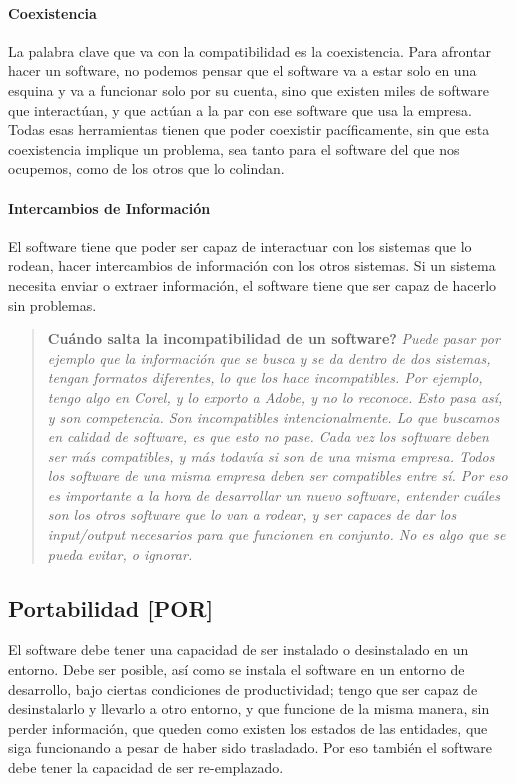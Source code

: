 \hypertarget{coexistencia}{%
\paragraph{Coexistencia}\label{coexistencia}}
La palabra clave que va con la compatibilidad
  es la coexistencia. Para afrontar hacer un software, no podemos pensar
  que el software va a estar solo en una esquina y va a funcionar solo
  por su cuenta, sino que existen miles de software que interactúan, y
  que actúan a la par con ese software que usa la empresa. Todas esas
  herramientas tienen que poder coexistir pacíficamente, sin que esta
  coexistencia implique un problema, sea tanto para el software del que
  nos ocupemos, como de los otros que lo colindan.
\hypertarget{intercambios}{%
\paragraph{Intercambios de Información}\label{intercambios}}
El software tiene que poder ser
  capaz de interactuar con los sistemas que lo rodean, hacer
  intercambios de información con los otros sistemas. Si un sistema
  necesita enviar o extraer información, el software tiene que ser capaz
  de hacerlo sin problemas.


\begin{quote}
\textbf{Cuándo salta la incompatibilidad de un software?}
\slshape{
Puede pasar
por ejemplo que la información que se busca y se da dentro de dos
sistemas, tengan formatos diferentes, lo que los hace incompatibles. Por
ejemplo, tengo algo en Corel, y lo exporto a Adobe, y no lo reconoce.
Esto pasa así, y son competencia. Son incompatibles intencionalmente. Lo
que buscamos en calidad de software, es que esto no pase. Cada vez los
software deben ser más compatibles, y más todavía si son de una misma
empresa. Todos los software de una misma empresa deben ser compatibles
entre sí. Por eso es importante a la hora de desarrollar un nuevo
software, entender cuáles son los otros software que lo van a rodear, y
ser capaces de dar los input/output necesarios para que funcionen en
conjunto. No es algo que se pueda evitar, o ignorar.}
\end{quote}

\hypertarget{portabilidad-por}{%
\subsection{Portabilidad {[}POR{]}}\label{portabilidad-por}}

El software debe tener una capacidad de ser instalado o desinstalado en
un entorno. Debe ser posible, así como se instala el software en un
entorno de desarrollo, bajo ciertas condiciones de productividad; tengo
que ser capaz de desinstalarlo y llevarlo a otro entorno, y que funcione
de la misma manera, sin perder información, que queden como existen los
estados de las entidades, que siga funcionando a pesar de haber sido
trasladado. Por eso también el software debe tener la capacidad de ser
re-emplazado.

